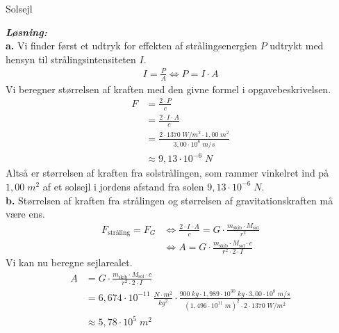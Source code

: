 \documentclass{report}
\newcommand{\sol}{\setlength{\parindent}{0cm}\textbf{\textit{Løsning:}}\setlength{\parindent}{1cm}}
\begin{document}
\begin{question}{Solsejl}{}
  
\end{question}
\sol \\
\textbf{a.}
Vi finder først et udtryk for effekten af strålingsenergien $P$ udtrykt med hensyn til strålingsintensiteten $I$. 
\begin{equation*}
\begin{split}
  I=\frac{P}{A} \iff P=I \cdot A
\end{split}
\end{equation*}
Vi beregner størrelsen af kraften med den givne formel i opgavebeskrivelsen.
\begin{equation*}
\begin{split}
  F&=\frac{2 \cdot P}{c}\\
  &=\frac{2 \cdot I \cdot A}{c}\\
  &=\frac{2 \cdot 1370 \;\unit{W/m^2} \cdot 1,00 \;\unit{m^2} }{3,00 \cdot 10^8 \;\unit{m/s} }\\
  &\approx 9,13 \cdot 10 ^{-6} \;\unit{N} 
\end{split}
\end{equation*}
Altså er størrelsen af kraften fra solstrålingen, som rammer vinkelret ind på $1,00 \;\unit{m^2} $ af et solsejl i jordens afstand fra solen $9,13 \cdot 10 ^{-6} \;\unit{N}  $. \\[1ex]
\textbf{b.}
Størrelsen af kraften fra strålingen og størrelsen af gravitationskraften må være ens.
\begin{equation*}
\begin{split}
  F _{\text{stråling} }= F_G &\iff \frac{2 \cdot I \cdot A}{c}=G \cdot \frac{m_{\text{skib} }\cdot M _{\text{sol} }}{r^2}\\
  &\iff A=G \cdot \frac{m_{\text{skib} }\cdot M _{\text{sol} } \cdot c}{r^2 \cdot 2 \cdot I}
\end{split}
\end{equation*}
Vi kan nu beregne sejlarealet.
\begin{equation*}
\begin{split}
  A&=G \cdot \frac{m_{\text{skib} }\cdot M _{\text{sol} } \cdot c}{r^2 \cdot 2 \cdot I}\\
  &=6,674 \cdot 10 ^{-11}\;\unit{\frac{N \cdot m^2}{kg^2}} \cdot \frac{900 \;\unit{kg} \cdot 1,989 \cdot 10^{30} \;\unit{kg} \cdot 3,00 \cdot 10^8 \;\unit{m/s} }{(1,496 \cdot 10 ^{11} \;\unit{m})^2 \cdot 2 \cdot 1370 \;\unit{W/m^2} }\\
  &\approx  5,78 \cdot 10^5\;\unit{m^2} 
\end{split}
\end{equation*}
\end{document}
